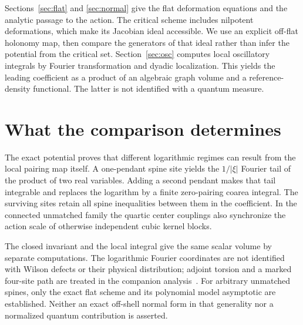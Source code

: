 \documentclass[11pt]{article}
\theoremstyle{remark}
\begin{document}
Sections~\ref{sec:flat} and \ref{sec:normal} give the flat deformation equations and the analytic passage to the action. The critical scheme includes nilpotent deformations, which make its Jacobian ideal accessible. We use an explicit off-flat holonomy map, then compare the generators of that ideal rather than infer the potential from the critical set. Section~\ref{sec:osc} computes local oscillatory integrals by Fourier transformation and dyadic localization. This yields the leading coefficient as a product of an algebraic graph volume and a reference-density functional. The latter is not identified with a quantum measure.






\section{What the comparison determines}

The exact potential proves that different logarithmic regimes can result from the local pairing map itself. A one-pendant spine site yields the \(1/|\xi|\) Fourier tail of the product of two real variables. Adding a second pendant makes that tail integrable and replaces the logarithm by a finite zero-pairing coarea integral. The surviving sites retain all spine inequalities between them in the coefficient. In the connected unmatched family the quartic center couplings also synchronize the action scale of otherwise independent cubic kernel blocks.

The closed invariant and the local integral give the same scalar volume by separate computations. The logarithmic Fourier coordinates are not identified with Wilson defects or their physical distribution; adjoint torsion and a marked four-site path are treated in the companion analysis~\cite{TorsionBridge}. For arbitrary unmatched spines, only the exact flat scheme and its polynomial model asymptotic are established. Neither an exact off-shell normal form in that generality nor a normalized quantum contribution is asserted.
\end{document}
